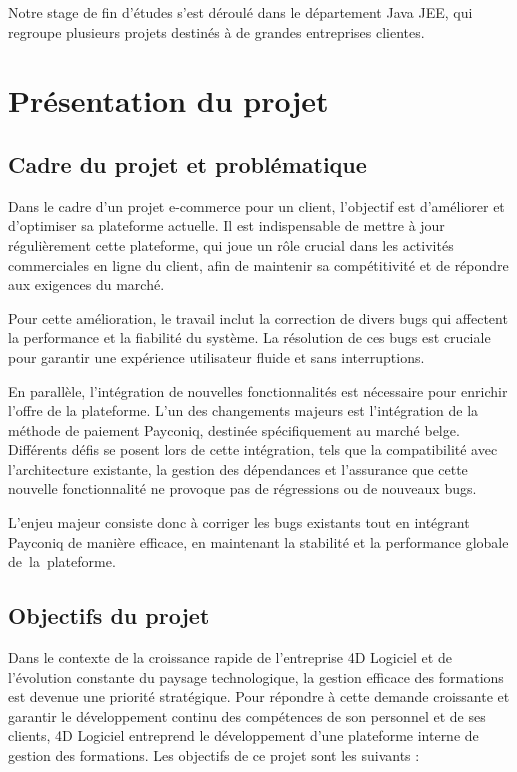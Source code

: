 Notre stage de fin d'études s'est déroulé dans le département Java JEE, qui regroupe plusieurs projets destinés à de grandes entreprises clientes.


\section{Présentation du projet}

\subsection{Cadre du projet et problématique}

Dans le cadre d'un projet e-commerce pour un client, l'objectif est d'améliorer et d'optimiser sa plateforme actuelle. Il est indispensable de mettre à jour régulièrement cette plateforme, qui joue un rôle crucial dans les activités commerciales en ligne du client, afin de maintenir sa compétitivité et de répondre aux exigences du marché.

Pour cette amélioration, le travail inclut la correction de divers bugs qui affectent la performance et la fiabilité du système. La résolution de ces bugs est cruciale pour garantir une expérience utilisateur fluide et sans interruptions.

En parallèle, l'intégration de nouvelles fonctionnalités est nécessaire pour enrichir l'offre de la plateforme. L'un des changements majeurs est l'intégration de la méthode de paiement Payconiq, destinée spécifiquement au marché belge. Différents défis se posent lors de cette intégration, tels que la compatibilité avec l'architecture existante, la gestion des dépendances et l'assurance que cette nouvelle fonctionnalité ne provoque pas de régressions ou de nouveaux bugs.

L'enjeu majeur consiste donc à corriger les bugs existants tout en intégrant Payconiq de manière efficace, en maintenant la stabilité et la performance globale de la plateforme.

 \subsection{Objectifs du projet}

Dans le contexte de la croissance rapide de l'entreprise 4D Logiciel et de l'évolution constante du paysage technologique, la gestion efficace des formations est devenue une priorité stratégique. Pour répondre à cette demande croissante et garantir le développement continu des compétences de son personnel et de ses clients, 4D Logiciel entreprend le développement d'une plateforme interne de gestion des formations. Les objectifs de ce projet sont les suivants :

